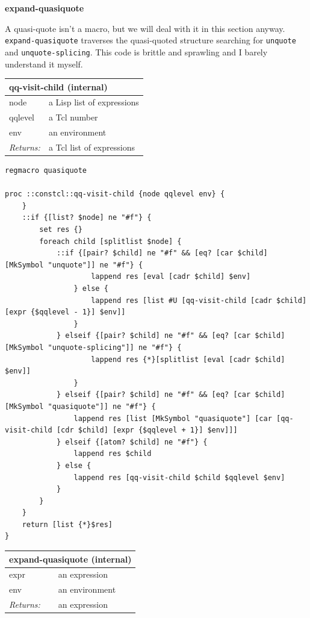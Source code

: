 \documentclass[twoside,9pt]{report}
\begin{document}
\textbf{expand-quasiquote}


A quasi-quote isn't a macro, but we will deal with it in this section anyway. \texttt{expand-quasiquote} traverses the quasi-quoted structure searching for \texttt{unquote} and \texttt{unquote-splicing}. This code is brittle and sprawling and I barely understand it myself.

\begin{tabular}{ |l l| }
\hline
\multicolumn{2}{|l|}{qq-visit-child (internal)} \\
\hline
node & a Lisp list of expressions \\
qqlevel & a Tcl number \\
env & an environment \\
\textit{Returns:} & a Tcl list of expressions \\
\hline
\end{tabular}

\noindent\makebox[\linewidth]{\rule{\linewidth}{0.4pt}}
\begin{lstlisting}
regmacro quasiquote
 
proc ::constcl::qq-visit-child {node qqlevel env} {
    }
    ::if {[list? $node] ne "#f"} {
        set res {}
        foreach child [splitlist $node] {
            ::if {[pair? $child] ne "#f" && [eq? [car $child] [MkSymbol "unquote"]] ne "#f"} {
                    lappend res [eval [cadr $child] $env]
                } else {
                    lappend res [list #U [qq-visit-child [cadr $child] [expr {$qqlevel - 1}] $env]]
                }
            } elseif {[pair? $child] ne "#f" && [eq? [car $child] [MkSymbol "unquote-splicing"]] ne "#f"} {
                    lappend res {*}[splitlist [eval [cadr $child] $env]]
                }
            } elseif {[pair? $child] ne "#f" && [eq? [car $child] [MkSymbol "quasiquote"]] ne "#f"} {
                lappend res [list [MkSymbol "quasiquote"] [car [qq-visit-child [cdr $child] [expr {$qqlevel + 1}] $env]]] 
            } elseif {[atom? $child] ne "#f"} {
                lappend res $child
            } else {
                lappend res [qq-visit-child $child $qqlevel $env]
            }
        }
    }
    return [list {*}$res]
}
\end{lstlisting}
\noindent\makebox[\linewidth]{\rule{\linewidth}{0.4pt}}
\begin{tabular}{ |l l| }
\hline
\multicolumn{2}{|l|}{expand-quasiquote (internal)} \\
\hline
expr & an expression \\
env & an environment \\
\textit{Returns:} & an expression \\
\hline
\end{tabular}
\end{document}
